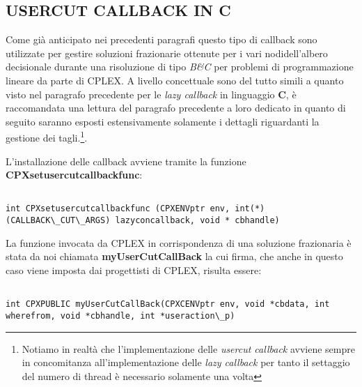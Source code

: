 \documentclass[11pt]{article}
\begin{document}
\subsection*{USERCUT CALLBACK IN C}
\label{sec:UserS}

Come già anticipato nei precedenti paragrafi questo tipo di callback sono utilizzate per gestire soluzioni frazionarie ottenute per i vari nodidell'albero decisionale durante una risoluzione di tipo \textit{B\&C} per problemi di programmazione lineare da parte di CPLEX. A livello concettuale sono del tutto simili a quanto visto nel paragrafo precedente per le \textit{lazy callback} in linguaggio \textbf{C}, è raccomandata una lettura del paragrafo precedente a loro dedicato in quanto di seguito saranno esposti estensivamente solamente i dettagli riguardanti la gestione dei tagli.\footnote{Notiamo in realtà che l'implementazione delle \textit{usercut callback} avviene sempre in concomitanza all'implementazione delle \textit{lazy callback} per tanto il settaggio del numero di thread è necessario solamente una volta}.

L'installazione delle callback avviene tramite la funzione \textbf{CPXsetusercutcallbackfunc}:

\begin{lstlisting}

int CPXsetusercutcallbackfunc (CPXENVptr env, int(*)(CALLBACK\_CUT\_ARGS) lazyconcallback, void * cbhandle)

\end{lstlisting}

La funzione invocata da CPLEX in corrispondenza di una soluzione frazionaria è stata da noi chiamata \textbf{myUserCutCallBack} la cui firma, che anche in questo caso viene imposta dai progettisti di CPLEX, risulta essere:

\begin{lstlisting}

int CPXPUBLIC myUserCutCallBack(CPXCENVptr env, void *cbdata, int wherefrom, void *cbhandle, int *useraction\_p)

\end{lstlisting}
\end{document}
